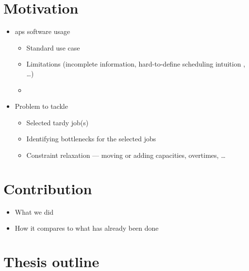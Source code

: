 
\section*{Motivation}

\begin{itemize}
    \item \ac{aps} software usage
    \begin{itemize}
        \item Standard use case
        \item Limitations (incomplete information, hard-to-define scheduling intuition , \dots)
        \item {}
    \end{itemize}

    \item Problem to tackle
    \begin{itemize}
        \item Selected tardy job(s)
        \item Identifying bottlenecks for the selected jobs
        \item Constraint relaxation --- moving or adding capacities, overtimes, \dots
    \end{itemize}
\end{itemize}

\section*{Contribution}

\begin{itemize}
    \item What we did
    \item How it compares to what has already been done
\end{itemize}

\section*{Thesis outline}

